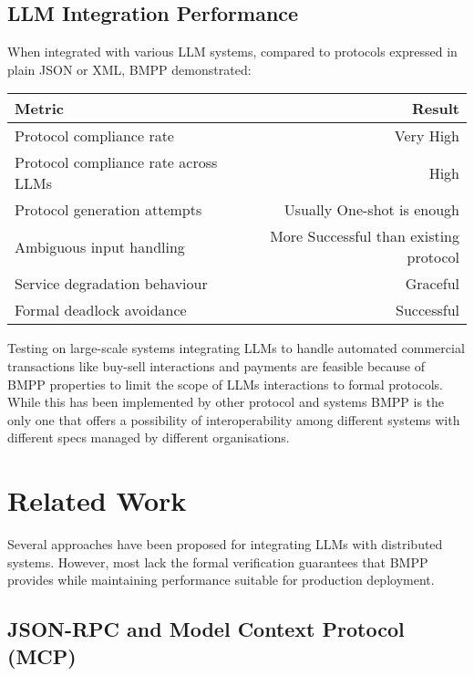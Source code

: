 \documentclass[11pt,a4paper]{article}
\begin{document}
	\subsection{LLM Integration Performance}
	\label{subsec:llm-performance}
	
	When integrated with various LLM systems, compared to protocols expressed in plain JSON or XML, BMPP demonstrated:
	\begin{center}
		\begin{tabular}{lr}
			\hline
			\textbf{Metric} & \textbf{Result} \\
			\hline
			Protocol compliance rate & Very High \\
			Protocol compliance rate across LLMs & High \\
			Protocol generation attempts & Usually One-shot is enough \\
			Ambiguous input handling & More Successful than existing protocol \\
			Service degradation behaviour & Graceful \\
			Formal deadlock avoidance & Successful \\
			\hline
		\end{tabular}
	\end{center}
	
	Testing on large-scale systems integrating LLMs to handle automated commercial transactions like buy-sell interactions and payments are feasible because of BMPP properties to limit the scope of LLMs interactions to formal protocols. While this has been implemented by other protocol and systems BMPP is the only one that offers a possibility of interoperability among different systems with different specs managed by different organisations. 
	
	\section{Related Work}
	\label{sec:related}
	
	Several approaches have been proposed for integrating LLMs with distributed systems. However, most lack the formal verification guarantees that BMPP provides while maintaining performance suitable for production deployment.
	
	\subsection{JSON-RPC and Model Context Protocol (MCP)}
	\label{subsec:json-rpc-mcp}
	
\end{document}
